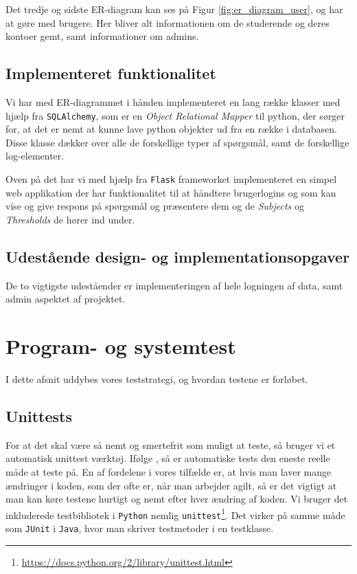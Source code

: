 \documentclass[11pt, a4paper]{article}
\begin{document}
Det tredje og sidste ER-diagram kan ses på Figur \ref{fig:er_diagram_user}, og har at gøre med brugere. Her bliver alt informationen om de studerende og deres kontoer gemt, samt informationer om admins.

\subsection{Implementeret funktionalitet}
\label{sub:implementeret_funktionalitet}
Vi har med ER-diagrammet i hånden implementeret en lang række klasser med hjælp fra \verb!SQLAlchemy!, som er en \emph{Object Relational Mapper} til python, der sørger for, at det er nemt at kunne lave python objekter ud fra en række i databasen. Disse klasse dækker over alle de forskellige typer af spørgsmål, samt de forskellige log-elementer.

Oven på det har vi med hjælp fra \verb!Flask! frameworket implementeret en simpel web applikation der har funktionalitet til at håndtere brugerlogins og som kan vise og give respons på spørgsmål og præsentere dem og de \emph{Subjects} og \emph{Thresholds} de hører ind under.

\subsection{Udestående design- og implementationsopgaver}
\label{sub:udestaende_design_og_implementationsopgaver}
De to vigtigste udeståender er implementeringen af hele logningen af data, samt admin aspektet af projektet.

\section{Program- og systemtest}
\label{sec:program_og_systemtest}
I dette afsnit uddybes vores teststrategi, og hvordan testene er forløbet.
\subsection{Unittests}
\label{sub:unittests}
For at det skal være så nemt og smertefrit som muligt at teste, så bruger vi et automatisk unittest værktøj. Ifølge \cite{COCO}, så er automatiske tests den eneste reelle måde at teste på. En af fordelene i vores tilfælde er, at hvis man laver mange ændringer i koden, som der ofte er, når man arbejder agilt, så er det vigtigt at man kan køre testene hurtigt og nemt efter hver ændring af koden. Vi bruger det inkluderede testbibliotek i \verb!Python! nemlig \verb!unittest!\footnote{\url{https://docs.python.org/2/library/unittest.html}}. Det virker på samme måde som \verb!JUnit! i \verb!Java!, hvor man skriver testmetoder i en testklasse.
\end{document}
